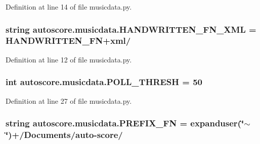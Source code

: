Definition at line 14 of file musicdata.\+py.

\subsubsection[{\texorpdfstring{H\+A\+N\+D\+W\+R\+I\+T\+T\+E\+N\+\_\+\+F\+N\+\_\+\+X\+ML}{HANDWRITTEN_FN_XML}}]{\setlength{\rightskip}{0pt plus 5cm}string autoscore.\+musicdata.\+H\+A\+N\+D\+W\+R\+I\+T\+T\+E\+N\+\_\+\+F\+N\+\_\+\+X\+ML = {\bf H\+A\+N\+D\+W\+R\+I\+T\+T\+E\+N\+\_\+\+FN}+\textquotesingle{}xml/\textquotesingle{}}\hypertarget{namespaceautoscore_1_1musicdata_a10c11cab7fc783ad0b9185fc95581f59}{}\label{namespaceautoscore_1_1musicdata_a10c11cab7fc783ad0b9185fc95581f59}


Definition at line 12 of file musicdata.\+py.

\subsubsection[{\texorpdfstring{P\+O\+L\+L\+\_\+\+T\+H\+R\+E\+SH}{POLL_THRESH}}]{\setlength{\rightskip}{0pt plus 5cm}int autoscore.\+musicdata.\+P\+O\+L\+L\+\_\+\+T\+H\+R\+E\+SH = 50}\hypertarget{namespaceautoscore_1_1musicdata_a4342208695b0441e76d13ad639c1d700}{}\label{namespaceautoscore_1_1musicdata_a4342208695b0441e76d13ad639c1d700}


Definition at line 27 of file musicdata.\+py.

\subsubsection[{\texorpdfstring{P\+R\+E\+F\+I\+X\+\_\+\+FN}{PREFIX_FN}}]{\setlength{\rightskip}{0pt plus 5cm}string autoscore.\+musicdata.\+P\+R\+E\+F\+I\+X\+\_\+\+FN = expanduser(\char`\"{}$\sim$\char`\"{})+\textquotesingle{}/Documents/auto-\/score/\textquotesingle{}}\hypertarget{namespaceautoscore_1_1musicdata_a684ad72261f10358480f889b7c755716}{}\label{namespaceautoscore_1_1musicdata_a684ad72261f10358480f889b7c755716}


